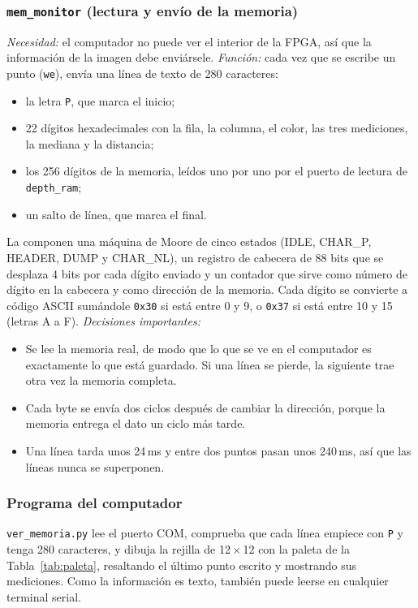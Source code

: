 \documentclass[conference]{IEEEtran}
\newcommand{\mo}[1]{\texttt{#1}}
\begin{document}
\subsubsection{\mo{mem\_monitor} (lectura y envío de la memoria)}
\emph{Necesidad:} el computador no puede ver el interior de la FPGA, así que la información de la imagen debe enviársele.
\emph{Función:} cada vez que se escribe un punto (\mo{we}), envía una línea de texto de 280 caracteres:
\begin{itemize}
\item la letra \texttt{P}, que marca el inicio;
\item 22 dígitos hexadecimales con la fila, la columna, el color, las tres mediciones, la mediana y la distancia;
\item los 256 dígitos de la memoria, leídos uno por uno por el puerto de lectura de \mo{depth\_ram};
\item un salto de línea, que marca el final.
\end{itemize}
La componen una máquina de Moore de cinco estados (IDLE, CHAR\_P, HEADER, DUMP y CHAR\_NL), un registro de cabecera de 88 bits que se desplaza 4 bits por cada dígito enviado y un contador que sirve como número de dígito en la cabecera y como dirección de la memoria. Cada dígito se convierte a código ASCII sumándole \texttt{0x30} si está entre 0 y 9, o \texttt{0x37} si está entre 10 y 15 (letras A a F).
\emph{Decisiones importantes:}
\begin{itemize}
\item Se lee la memoria real, de modo que lo que se ve en el computador es exactamente lo que está guardado. Si una línea se pierde, la siguiente trae otra vez la memoria completa.
\item Cada byte se envía dos ciclos después de cambiar la dirección, porque la memoria entrega el dato un ciclo más tarde.
\item Una línea tarda unos 24\,ms y entre dos puntos pasan unos 240\,ms, así que las líneas nunca se superponen.
\end{itemize}

\subsubsection{Programa del computador}
\mo{ver\_memoria.py} lee el puerto COM, comprueba que cada línea empiece con \texttt{P} y tenga 280 caracteres, y dibuja la rejilla de 12\,$\times$\,12 con la paleta de la Tabla~\ref{tab:paleta}, resaltando el último punto escrito y mostrando sus mediciones. Como la información es texto, también puede leerse en cualquier terminal serial.
\end{document}
